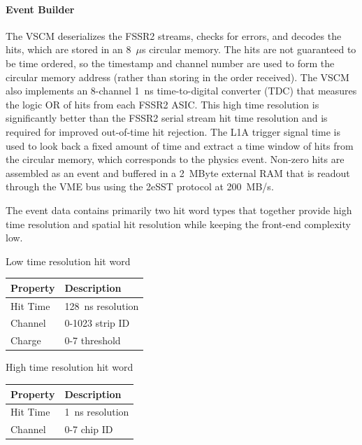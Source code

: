 \paragraph{Event Builder}
The VSCM deserializes the FSSR2 streams, checks for errors, and decodes the hits, which are stored in an 8~$\mu$s circular memory. The hits are not guaranteed to be time ordered, so the timestamp and channel number are used to form the circular memory address (rather than storing in the order received). The VSCM also implements an 8-channel 1~ns time-to-digital converter (TDC) that measures the logic OR of hits from each FSSR2 ASIC. This high time resolution is significantly better than the FSSR2 serial stream hit time resolution and is required for improved out-of-time hit rejection. The L1A trigger signal time is used to look back a fixed amount of time and extract a time window of hits from the circular memory, which corresponds to the physics event. Non-zero hits are assembled as an event and buffered in a 2~MByte external RAM that is readout through the VME bus using the 2eSST protocol at 200~MB/s.

The event data contains primarily two hit word types that together provide high time resolution and spatial hit resolution while keeping the front-end complexity low.

\begin{center}
	Low time resolution hit word\\
	\begin{tabular}{| l | l |}
		\hline \hline
		Property	& Description		\\
		\hline
		Hit Time	& 128~ns resolution	\\
		Channel		& 0-1023 strip ID	\\
		Charge		& 0-7 threshold		\\
		\hline \hline
	\end{tabular}
\end{center}

\begin{center}
	High time resolution hit word\\
	\begin{tabular}{| l | l |}
		\hline \hline
		Property	& Description		\\
		\hline
		Hit Time	& 1~ns resolution	\\
		Channel		& 0-7 chip ID		\\
		\hline \hline
	\end{tabular}
\end{center}

